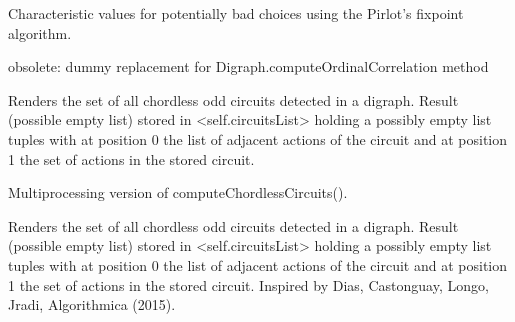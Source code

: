 \documentclass[letterpaper,10pt,english]{sphinxmanual}
\begin{document}
\begin{fulllineitems}
\begin{fulllineitems}
\label{techDoc:digraphs.Digraph.computeBadPirlotChoices}
Characteristic values for potentially bad choices
using the Pirlot's fixpoint algorithm.

\end{fulllineitems}


\begin{fulllineitems}
\label{techDoc:digraphs.Digraph.computeBipolarCorrelation}
obsolete: dummy replacement for Digraph.computeOrdinalCorrelation method

\end{fulllineitems}


\begin{fulllineitems}
\label{techDoc:digraphs.Digraph.computeChordlessCircuits}
Renders the set of all chordless odd circuits detected in a digraph.
Result (possible empty list) stored in \textless{}self.circuitsList\textgreater{}
holding a possibly empty list tuples with at position 0 the
list of adjacent actions of the circuit and at position 1
the set of actions in the stored circuit.

\end{fulllineitems}


\begin{fulllineitems}
\label{techDoc:digraphs.Digraph.computeChordlessCircuitsMP}
Multiprocessing version of computeChordlessCircuits().

Renders the set of all chordless odd circuits detected in a digraph.
Result (possible empty list) stored in \textless{}self.circuitsList\textgreater{}
holding a possibly empty list tuples with at position 0 the
list of adjacent actions of the circuit and at position 1
the set of actions in the stored circuit.
Inspired by Dias, Castonguay, Longo, Jradi, Algorithmica (2015).


\end{fulllineitems}
\end{fulllineitems}
\end{document}

